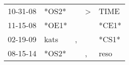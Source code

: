 \begin{supertabular}{lllll}
 10-31-08 &  *OS2* &    &  \textgreater &   TIME \\
 11-15-08 &  *OE1* &    &               &  *CE1* \\
 02-19-09 &   kats &  , &               &  *CS1* \\
 08-15-14 &  *OS2* &    &             , &   reso \\
\end{supertabular}
